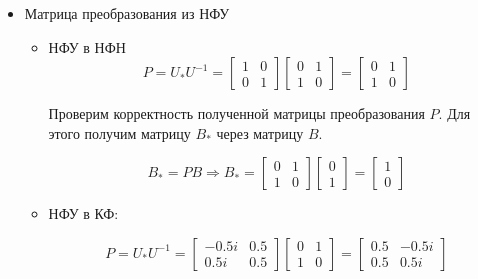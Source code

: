 \begin{itemize}
	\item Матрица преобразования из НФУ
	\begin{itemize}
	\item НФУ в НФН
	\begin{equation*}
	\text{$P=U_{*}U^{-1}=
	\begin{bmatrix} 1 & 0 \\ 0  &  1 \end{bmatrix}	
	\begin{bmatrix} 0 & 1 \\ 1 & 0 \end{bmatrix}=  
	\begin{bmatrix} 0 & 1 \\   1  & 0 \end{bmatrix} $}
	\end{equation*}
	
	Проверим корректность полученной матрицы преобразования $P$. Для этого получим матрицу $B_{*}$ через матрицу $B$. 
	
	\begin{equation*}
	\text{$B_{*}=PB$}
	\Longrightarrow
	\text{$B_{*}
	=\begin{bmatrix}0 &  1 \\ 1 &  0 \end{bmatrix}
	\begin{bmatrix} 0 \\ 1 \end{bmatrix}
	=\begin{bmatrix} 1 \\ 0 \end{bmatrix}$}
	\end{equation*}
	
	\item НФУ в КФ:
	
	\begin{equation*}
	\text{$P=U_{*}U^{-1}=
	\begin{bmatrix}  -0.5i  &  0.5 \\
    0.5i  & 0.5 \end{bmatrix}
	\begin{bmatrix} 0 & 1 \\ 1 & 0 \end{bmatrix}
	=\begin{bmatrix} 0.5 &   -0.5i \\ 0.5 & 0.5i \end{bmatrix}$}
	\end{equation*}
	

\end{itemize}
\end{itemize}
